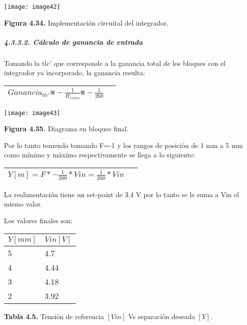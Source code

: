 \documentclass{article} %
\begin{document}
\noindent \texttt{[image: image42]}

\noindent \textbf{Figura 4.34. }Implementaci\'{o}n circuital del integrador.

\noindent 
\subparagraph{4.3.3.2. C\'{a}lculo de ganancia de entrada}

\noindent Tomando la tlc' que corresponde a la ganancia total de los bloques con el integrador ya incorporado, la ganancia resulta:

\noindent 

\begin{tabular}{|p{3.9in}|p{0.4in}|} \hline 
${Ganancia}_{tlc'}\textrm{⩬}-\frac{1}{H_{estim}}\textrm{⩬}-\frac{1}{260}$ &  \\ \hline 
\end{tabular}



\noindent \texttt{[image: image43]}

\noindent \textbf{Figura 4.35. }Diagrama en bloques final.

\noindent 

\noindent Por lo tanto teniendo tomando F=-1 y los rangos de posici\'{o}n de 1 mm a 5 mm como m\'{i}nimo y m\'{a}ximo respectivamente se llega a lo siguiente:

\noindent 

\begin{tabular}{|p{3.9in}|p{0.4in}|} \hline 
$Y[m]=F*-\frac{1}{260}*Vin=\frac{1}{260}*Vin\ $ &  \\ \hline 
\end{tabular}



\noindent La realimentaci\'{o}n tiene un set-point de 3.4 V por lo tanto se le suma a Vin el mismo valor.

\noindent 

\noindent Los valores finales son:

\noindent 

\begin{tabular}{|p{2.1in}|p{2.1in}|} \hline 
$Y[mm]$ & $Vin[V]$ \\ \hline 
5 & 4.7 \\ \hline 
4 & 4.44 \\ \hline 
3 & 4.18 \\ \hline 
2 & 3.92 \\ \hline 
\end{tabular}

\textbf{Tabla 4.5. }Tensi\'{o}n de referencia $[Vin]$ Vs separaci\'{o}n deseada $[Y]$.
\end{document}
